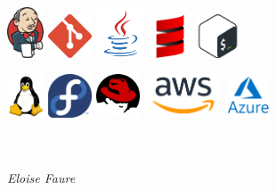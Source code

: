 \documentclass[]{friggeri-cv}
\begin{document}
\qquad \qquad   \includegraphics[height=15mm]{logo/jenkins-logo.png} \qquad  \qquad
\includegraphics[height=13mm]{logo/git-logo.png} \qquad
\includegraphics[height=15mm]{logo/java-logo.png} \qquad 
\includegraphics[height=13mm]{logo/scala-logo.png} \qquad 
\includegraphics[height=13mm]{logo/bash-logo.png} \qquad
\vspace{3mm}

\includegraphics[height=13mm]{logo/linux-logo.png} \qquad \qquad
\includegraphics[height=13mm]{logo/fedora-logo.png} \qquad \qquad
\includegraphics[height=13mm]{logo/redhat-logo.png} \qquad
\includegraphics[height=13mm]{logo/aws-logo.png}\qquad 
\includegraphics[height=13mm]{logo/azure-logo.png} \qquad
\\ 
\\ 
\\ 
\begin{flushright}
\emph{Eloise Faure}
\end{flushright}
\end{document}
